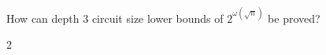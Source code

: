 \documentclass{article}
\begin{document}

    \thispagestyle{fancy}

    \begin{question}

        How can depth $3$ circuit size lower bounds of $2^{\omega\left(\sqrt{n}\right)}$ be proved?

    \end{question}

    \begin{subquestions}
        \item 2
    \end{subquestions}


    \printbibliography
\end{document}
